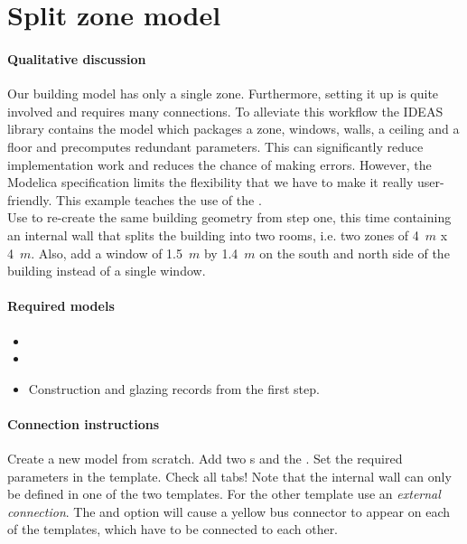 \documentclass[10pt,a4paper]{article}
\begin{document}
\newpage

\section{Split zone model}
\paragraph{Qualitative discussion}
Our building model has only a single zone. 
Furthermore, setting it up is quite involved and requires many connections.
To alleviate this workflow the IDEAS library contains the model
 which packages a zone, 
windows, walls, a ceiling and a floor and precomputes redundant parameters.
This can significantly reduce implementation work and reduces the chance of making 
errors. 
However, the Modelica specification limits the flexibility that we have to make it really
user-friendly.
This example teaches the use of the .\\

Use  to re-create the same building geometry from
step one, this time containing an internal wall that splits the building into two rooms, i.e. two
zones of 4~$m$ x 4~$m$. Also, add a window of 1.5~$m$ by 1.4~$m$ on the south and north side of the building instead of a single window. 

\paragraph{Required models}
\begin{itemize}
\item {}
\item {}
\item Construction and glazing records from the first step.
\end{itemize}

\paragraph{Connection instructions}
Create a new model from scratch. Add two s and the .
Set the required parameters in the template. Check all tabs! 
Note that the internal wall can only be defined in one of the two templates.
For the other template use an \textit{external connection}. 
The  and  option will cause a 
yellow bus connector to appear on each of the templates,
which have to be connected to each other.
\end{document}
